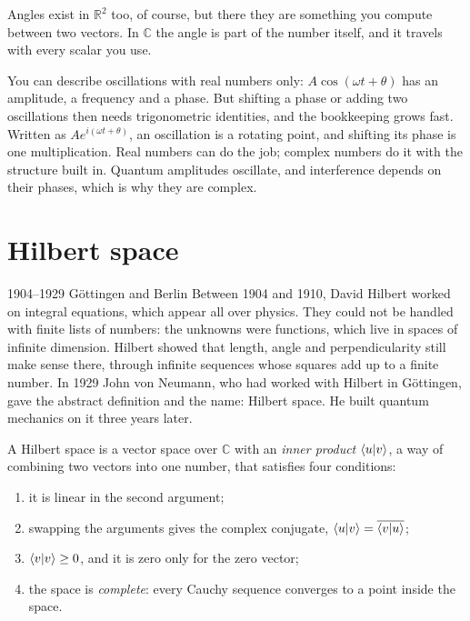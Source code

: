 Angles exist in $\mathbb{R}^2$ too, of course, but there they are something you
compute between two vectors. In $\mathbb{C}$ the angle is part of the number
itself, and it travels with every scalar you use.

You can describe oscillations with real numbers only: $A\cos(\omega t + \theta)$
has an amplitude, a frequency and a phase. But shifting a phase or adding two
oscillations then needs trigonometric identities, and the bookkeeping grows fast.
Written as $Ae^{i(\omega t + \theta)}$, an oscillation is a rotating point, and
shifting its phase is one multiplication. Real numbers can do the job; complex
numbers do it with the structure built in. Quantum amplitudes oscillate, and
interference depends on their phases, which is why they are complex.

\section{Hilbert space}

\begin{history}{1904--1929 \textperiodcentered{} Göttingen and Berlin}
Between 1904 and 1910, David Hilbert worked on integral equations, which appear
all over physics. They could not be handled with finite lists of numbers: the
unknowns were functions, which live in spaces of infinite dimension. Hilbert
showed that length, angle and perpendicularity still make sense there, through
infinite sequences whose squares add up to a finite number. In 1929 John von
Neumann, who had worked with Hilbert in Göttingen, gave the abstract definition
and the name: Hilbert space. He built quantum mechanics on it three years later.
\end{history}

A Hilbert space is a vector space over $\mathbb{C}$ with an \emph{inner product}
$\braket{u|v}$, a way of combining two vectors into one number, that satisfies
four conditions:

\begin{enumerate}
\item it is linear in the second argument;
\item swapping the arguments gives the complex conjugate,
$\braket{u|v} = \overline{\braket{v|u}}$;
\item $\braket{v|v} \geq 0$, and it is zero only for the zero vector;
\item the space is \emph{complete}: every Cauchy sequence converges to a point
inside the space.
\end{enumerate}

